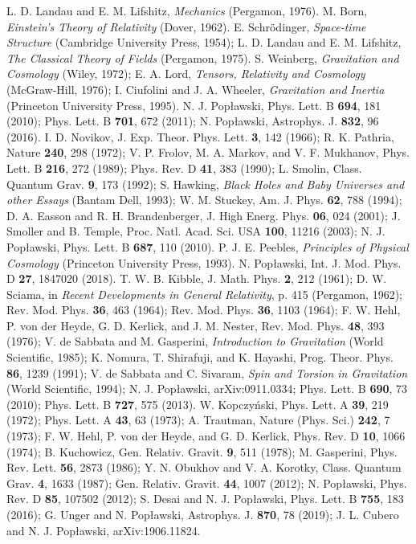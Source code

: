 \documentclass[prl,twocolumn,nofootinbib]{revtex4}
\begin{document}
\begin{thebibliography}{}
 L. D. Landau and E. M. Lifshitz, {\it Mechanics} (Pergamon, 1976).
 M. Born, {\em Einstein's Theory of Relativity} (Dover, 1962).
 E. Schr\"{o}dinger, {\it Space-time Structure} (Cambridge University Press, 1954); L. D. Landau and E. M. Lifshitz, {\it The Classical Theory of Fields} (Pergamon, 1975).
 S. Weinberg, {\em Gravitation and Cosmology} (Wiley, 1972); E. A. Lord, {\em Tensors, Relativity and Cosmology} (McGraw-Hill, 1976); I. Ciufolini and J. A. Wheeler, {\em Gravitation and Inertia} (Princeton University Press, 1995).
 N. J. Pop{\l}awski, Phys. Lett. B {\bf 694}, 181 (2010); Phys. Lett. B {\bf 701}, 672 (2011); N. Pop{\l}awski, Astrophys. J. {\bf 832}, 96 (2016).
 I. D. Novikov, J. Exp. Theor. Phys. Lett. {\bf 3}, 142 (1966); R. K. Pathria, Nature {\bf 240}, 298 (1972); V. P. Frolov, M. A. Markov, and V. F. Mukhanov, Phys. Lett. B {\bf 216}, 272 (1989); Phys. Rev. D {\bf 41}, 383 (1990); L. Smolin, Class. Quantum Grav. {\bf 9}, 173 (1992); S. Hawking, {\it Black Holes and Baby Universes and other Essays} (Bantam Dell, 1993); W. M. Stuckey, Am. J. Phys. {\bf 62}, 788 (1994); D. A. Easson and R. H. Brandenberger, J. High Energ. Phys. {\bf 06}, 024 (2001); J. Smoller and B. Temple, Proc. Natl. Acad. Sci. USA {\bf 100}, 11216 (2003); N. J. Pop{\l}awski, Phys. Lett. B {\bf 687}, 110 (2010).
 P. J. E. Peebles, {\em Principles of Physical Cosmology} (Princeton University Press, 1993).
 N. Pop{\l}awski, Int. J. Mod. Phys. D {\bf 27}, 1847020 (2018).
 T. W. B. Kibble, J. Math. Phys. {\bf 2}, 212 (1961); D. W. Sciama, in {\em Recent Developments in General Relativity}, p. 415 (Pergamon, 1962); Rev. Mod. Phys. {\bf 36}, 463 (1964); Rev. Mod. Phys. {\bf 36}, 1103 (1964); F. W. Hehl, P. von der Heyde, G. D. Kerlick, and J. M. Nester, Rev. Mod. Phys. {\bf 48}, 393 (1976); V. de Sabbata and M. Gasperini, {\it Introduction to Gravitation} (World Scientific, 1985); K. Nomura, T. Shirafuji, and K. Hayashi, Prog. Theor. Phys. {\bf 86}, 1239 (1991); V. de Sabbata and C. Sivaram, {\it Spin and Torsion in Gravitation} (World Scientific, 1994); N. J. Pop{\l}awski, arXiv:0911.0334; Phys. Lett. B {\bf 690}, 73 (2010); Phys. Lett. B {\bf 727}, 575 (2013).
 W. Kopczy\'{n}ski, Phys. Lett. A {\bf 39}, 219 (1972); Phys. Lett. A {\bf 43}, 63 (1973); A. Trautman, Nature (Phys. Sci.) {\bf 242}, 7 (1973); F. W. Hehl, P. von der Heyde, and G. D. Kerlick, Phys. Rev. D {\bf 10}, 1066 (1974); B. Kuchowicz, Gen. Relativ. Gravit. {\bf 9}, 511 (1978); M. Gasperini, Phys. Rev. Lett. {\bf 56}, 2873 (1986); Y. N. Obukhov and V. A. Korotky, Class. Quantum Grav. {\bf 4}, 1633 (1987); Gen. Relativ. Gravit. {\bf 44}, 1007 (2012); N. Pop{\l}awski, Phys. Rev. D {\bf 85}, 107502 (2012); S. Desai and N. J. Pop{\l}awski, Phys. Lett. B {\bf 755}, 183 (2016); G. Unger and N. Pop{\l}awski, Astrophys. J. {\bf 870}, 78 (2019); J. L. Cubero and N. J. Pop{\l}awski, arXiv:1906.11824.
\end{thebibliography}
\end{document}
